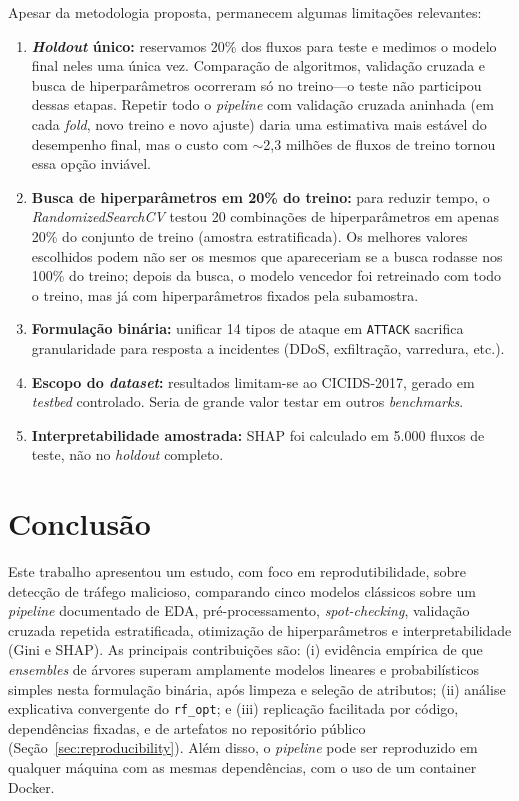 \documentclass[12pt]{article}
\makeatletter
\newlength{\sbcblockmargin}
\newenvironment{sbcnarrowblock}{%
  \list{}{%
    \topsep\z@
    \partopsep\z@
    \itemsep\z@
    \parsep\z@
    \leftmargin=\sbcblockmargin
    \rightmargin=\sbcblockmargin
    \listparindent=\parindent
    \itemindent=\z@
    \labelwidth=\z@
    \labelsep=\z@
  }\item\relax}
{\endlist}
\makeatother
\begin{document}
\begin{sbcnarrowblock}
Apesar da metodologia proposta, permanecem algumas limitações relevantes:
\begin{enumerate}
  \item \textbf{\textit{Holdout} único:} reservamos 20\% dos fluxos para teste e medimos o modelo final neles uma única vez. Comparação de algoritmos, validação cruzada e busca de hiperparâmetros ocorreram só no treino---o teste não participou dessas etapas. Repetir todo o \textit{pipeline} com validação cruzada aninhada (em cada \textit{fold}, novo treino e novo ajuste) daria uma estimativa mais estável do desempenho final, mas o custo com $\sim$2,3 milhões de fluxos de treino tornou essa opção inviável.
  \item \textbf{Busca de hiperparâmetros em 20\% do treino:} para reduzir tempo, o \textit{RandomizedSearchCV} testou 20 combinações de hiperparâmetros em apenas 20\% do conjunto de treino (amostra estratificada). Os melhores valores escolhidos podem não ser os mesmos que apareceriam se a busca rodasse nos 100\% do treino; depois da busca, o modelo vencedor foi retreinado com todo o treino, mas já com hiperparâmetros fixados pela subamostra.
  \item \textbf{Formulação binária:} unificar 14 tipos de ataque em \texttt{ATTACK} sacrifica granularidade para resposta a incidentes (DDoS, exfiltração, varredura, etc.).
  \item \textbf{Escopo do \textit{dataset}:} resultados limitam-se ao CICIDS-2017, gerado em \textit{testbed} controlado. Seria de grande valor testar em outros \textit{benchmarks}.
\  \item \textbf{Interpretabilidade amostrada:} SHAP foi calculado em 5.000 fluxos de teste, não no \textit{holdout} completo.
\end{enumerate}

\section{Conclusão}
\label{sec:conclusion}

Este trabalho apresentou um estudo, com foco em reprodutibilidade, sobre detecção de tráfego malicioso, comparando cinco modelos clássicos sobre um \textit{pipeline} documentado de EDA, pré-processamento, \textit{spot-checking}, validação cruzada repetida estratificada, otimização de hiperparâmetros e interpretabilidade (Gini e SHAP).
As principais contribuições são: (i) evidência empírica de que \textit{ensembles} de árvores superam amplamente modelos lineares e probabilísticos simples nesta formulação binária, após limpeza e seleção de atributos; (ii) análise explicativa convergente do \texttt{rf\_opt}; e (iii) replicação facilitada por código, dependências fixadas, e de artefatos no repositório público (Seção~\ref{sec:reproducibility}). Além disso, o \textit{pipeline} pode ser reproduzido em qualquer máquina com as mesmas dependências, com o uso de um container Docker.


\end{sbcnarrowblock}
\end{document}

